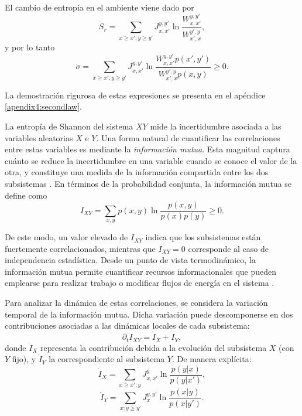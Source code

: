 El cambio de entropía en el ambiente viene dado por
\begin{equation*}
    \dot{S}_{r} = \sum_{x\geq x'; y\geq y'} J_{x,x'}^{y,y'} \ln \frac{W_{x,x'}^{y,y'}}{W_{x',x}^{y',y}},
\end{equation*}
y por lo tanto
\begin{equation*}
    \dot{\sigma} = \sum_{x\geq x'; y\geq y'} J_{x,x'}^{y,y'} \ln \frac{ W_{x,x'}^{y,y'}p(x',y')  }{ W_{x',x}^{y',y}p(x,y) } \geq 0.
\end{equation*}

La demostración rigurosa de estas expresiones se presenta en el apéndice \ref{apendix4:secondlaw}.  

La entropía de Shannon del sistema \( XY \) mide la incertidumbre asociada a las variables aleatorias \( X \) e \( Y \). Una forma natural de cuantificar las correlaciones entre estas variables es mediante la \textit{información mutua}. Esta magnitud captura cuánto se reduce la incertidumbre en una variable cuando se conoce el valor de la otra, y constituye una medida de la información compartida entre los dos subsistemas \cite{parrondo2015thermodynamics,cover1999elements}. En términos de la probabilidad conjunta, la información mutua se define como
\begin{equation*}
    I_{XY} = \sum_{x,y} p(x,y) \ln \frac{p(x,y)}{p(x)p(y)} \geq 0. 
\end{equation*}

De este modo, un valor elevado de \( I_{XY} \) indica que los subsistemas están fuertemente correlacionados, mientras que \( I_{XY}=0 \) corresponde al caso de independencia estadística. Desde un punto de vista termodinámico, la información mutua permite cuantificar recursos informacionales que pueden emplearse para realizar trabajo o modificar flujos de energía en el sistema \cite{parrondo2015thermodynamics}.  

Para analizar la dinámica de estas correlaciones, se considera la variación temporal de la información mutua. Dicha variación puede descomponerse en dos contribuciones asociadas a las dinámicas locales de cada subsistema:
\[
\partial_t I_{XY} = \dot{I}_{X} + \dot{I}_{Y},
\]
donde \( \dot{I}_{X} \) representa la contribución debida a la evolución del subsistema \( X \) (con \( Y \) fijo), y \( \dot{I}_{Y} \) la correspondiente al subsistema \( Y \)\cite{horowitz2014thermodynamics}. De manera explícita:
\begin{equation}
    \dot{I}_{X}  = \sum_{x\geq x'; y}J_{x,x'}^{y} \ln \frac{ p(y|x) }{p(y|x')},
    \label{sec4:clasicalflows0}
\end{equation}
\begin{equation}    
    \dot{I}_{Y}  = \sum_{x;y\geq y'} J_{x}^{y,y'} \ln \frac{p(x|y)}{ p(x|y') }.
    \label{sec4:clasicalflows}
\end{equation}

